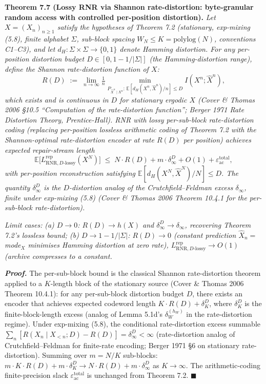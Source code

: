 \documentclass[
]{article}
\begin{document}
\textbf{Theorem 7.7 (Lossy RNR via Shannon rate-distortion: byte-granular
random access with controlled per-position distortion).}
\emph{Let $X = (X_n)_{n \geq 1}$ satisfy the hypotheses of Theorem 7.2
(stationary, exp-mixing (5.8), finite alphabet $\Sigma$, sub-block
spacing $W_N \leq K = \mathrm{polylog}(N)$, conventions C1--C3),
and let $d_H : \Sigma \times \Sigma \to \{0, 1\}$ denote Hamming
distortion. For any per-position distortion budget $D \in [0,
1 - 1/|\Sigma|]$ (the Hamming-distortion range), define the
Shannon rate-distortion function of $X$:}
\[
R(D) \;:=\; \lim_{n \to \infty} \tfrac{1}{n} \min_{P_{\hat{X}^n \mid X^n} :\, \mathbb{E}[d_H(X^n, \hat{X}^n)/n] \leq D}
I(X^n; \hat{X}^n),
\]
\emph{which exists and is continuous in $D$ for stationary ergodic
$X$ (Cover \& Thomas 2006 §10.5 ``Computation of the rate-distortion
function''; Berger 1971 \emph{Rate Distortion Theory}, Prentice-Hall).
RNR with lossy per-sub-block rate-distortion coding (replacing
per-position lossless arithmetic coding of Theorem 7.2 with the
Shannon-optimal rate-distortion encoder at rate $R(D)$ per position)
achieves expected repair-stream length}
\[
\mathbb{E}\bigl[L^{\mathrm{rep}}_{\mathrm{RNR}, D\text{-lossy}}(X^N)\bigr]
\;\leq\;
N \cdot R(D) + m \cdot \delta_\infty^D + O(1) + \varepsilon_{\mathrm{ac}}^{\mathrm{total}},
\]
\emph{with per-position reconstruction satisfying $\mathbb{E}[d_H(X^N,
\hat{X}^N)/N] \leq D$. The quantity $\delta_\infty^D$ is the
$D$-distortion analog of the Crutchfield--Feldman excess
$\delta_\infty$, finite under exp-mixing (5.8) (Cover \& Thomas 2006
Theorem 10.4.1 for the per-sub-block rate-distortion).}

\emph{Limit cases:} \emph{(a) $D \to 0$: $R(D) \to h(X)$ and
$\delta_\infty^D \to \delta_\infty$, recovering Theorem 7.2's lossless
bound; (b) $D \to 1 - 1/|\Sigma|$: $R(D) \to 0$ (constant prediction
$\hat{X}_n = $ mode$_X$ minimises Hamming distortion at zero rate),
$L^{\mathrm{rep}}_{\mathrm{RNR}, D\text{-lossy}} \to O(1)$
(archive compresses to a constant.}

\emph{\textbf{Proof.}} The per-sub-block bound is the classical Shannon
rate-distortion theorem applied to a $K$-length block of the
stationary source (Cover \& Thomas 2006 Theorem 10.4.1):
for any per-sub-block distortion budget $D$, there exists an encoder
that achieves expected codeword length
$K \cdot R(D) + \delta_K^D$, where $\delta_K^D$ is the
finite-block-length excess (analog of Lemma 5.1d's $\delta_W^{(h_W)}$
in the rate-distortion regime). Under exp-mixing (5.8), the
conditional rate-distortion excess summable
$\sum_n [R(X_n \mid X_{<n}; D) - R(D)] = \delta_\infty^D < \infty$
(rate-distortion analog of Crutchfield--Feldman for finite-rate
encoding; Berger 1971 §6 on stationary rate-distortion).
Summing over $m = N/K$ sub-blocks: $m \cdot K \cdot R(D) + m \cdot
\delta_K^D \to N \cdot R(D) + m \cdot \delta_\infty^D$ as $K \to
\infty$. The arithmetic-coding finite-precision slack
$\varepsilon_{\mathrm{ac}}^{\mathrm{total}}$ is unchanged from
Theorem 7.2.
\hfill$\blacksquare$
\end{document}
